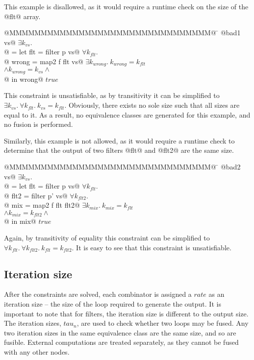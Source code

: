 This example is disallowed, as it would require a runtime check on the size of the @flt@ array.
\begin{tabbing}
@MMMMMMMMMMMMMMMMMMMMMMMMMMMMMMMM@  \= \kill
@bad1 vs@                           \> $\exists k_{vs}.$ \\
@ = let flt   = filter p vs@        \> $\forall k_{flt}.$ \\
@       wrong = map2   f flt vs@    \> $\exists k_{wrong}.\ k_{wrong} = k_{flt}$ \\
                                    \> $\wedge k_{wrong} = k_{vs} \wedge$ \\
@   in  wrong@                      \> $true$
\end{tabbing}
This constraint is unsatisfiable, as by transitivity it can be simplified to $\exists k_{vs}.\ \forall k_{flt}.\ k_{vs} = k_{flt}$.
Obviously, there exists no sole size such that all sizes are equal to it.
As a result, no equivalence classes are generated for this example, and no fusion is performed.


Similarly, this example is not allowed, as it would require a runtime check to determine that the output of two filters @flt@ and @flt2@ are the same size.
\begin{tabbing}
@MMMMMMMMMMMMMMMMMMMMMMMMMMMMMMMM@  \= \kill
@bad2 vs@                           \> $\exists k_{vs}.$ \\
@ = let flt  = filter p  vs@        \> $\forall k_{flt}.$ \\
@       flt2 = filter p' vs@        \> $\forall k_{flt2}.$ \\
@       mix  = map2   f  flt flt2@  \> $\exists k_{mix}.\ k_{mix} = k_{flt}$ \\
                                    \> $\wedge k_{mix} = k_{flt2} \wedge$ \\
@   in  mix@                        \> $true$                               \\
\end{tabbing}
Again, by transitivity of equality this constraint can be simplified to $\forall k_{flt}.\ \forall k_{flt2}.\ k_{flt} = k_{flt2}$.
It is easy to see that this constraint is unsatisfiable.


\subsection{Iteration size}
After the constraints are solved, each combinator is assigned a $rate$ as an iteration size -- the size of the loop required to generate the output.
It is important to note that for filters, the iteration size is different to the output size.
The iteration sizes, $tau_n$, are used to check whether two loops may be fused.
Any two iteration sizes in the same equivalence class are the same size, and so are fusible.
External computations are treated separately, as they cannot be fused with any other nodes.

